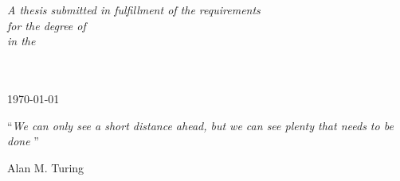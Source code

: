 \documentclass[
    11pt,
    oneside, %
    english,
    onehalfspacing, %
parskip, %
]{PhDDoctoralThesis}
\begin{document}
\begin{titlepage}
\begin{center}
            \large \textit{A thesis submitted in fulfillment of the requirements\\ for the degree of \degreename}\\[0.3cm] %
            \textit{in the}\\[0.4cm]
            \facname \\ \deptname\\[2cm]

            \vfill

            {\large \today}\\[4cm] %

            \vfill
        \end{center}
    \end{titlepage}


    \vspace*{0.2\textheight}

    \noindent\enquote{\itshape We can only see a short distance ahead, but we can see plenty that needs to be done }\bigbreak

    \hfill Alan M. Turing


\end{document}
